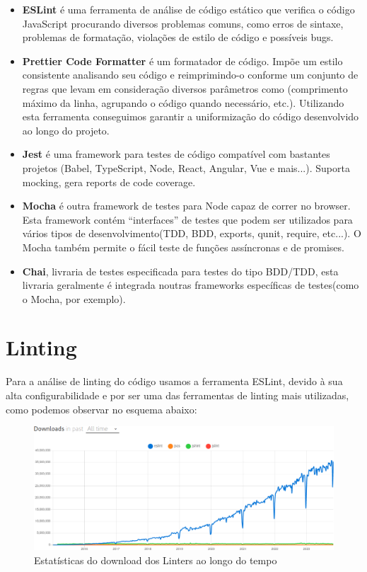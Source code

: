 \documentclass[a4paper,12pt]{article} %
\begin{document}
\begin{itemize}
	\item \textbf{ESLint} é uma ferramenta de análise de código estático que verifica o código JavaScript procurando diversos problemas comuns, como erros de sintaxe, problemas de formatação, violações de estilo de código e possíveis bugs.

	\item \textbf{Prettier Code Formatter} é um formatador de código. Impõe um estilo consistente analisando seu código e reimprimindo-o conforme um conjunto de regras que levam em consideração diversos parâmetros como (comprimento máximo da linha, agrupando o código quando necessário, etc.). Utilizando esta ferramenta conseguimos garantir a uniformização do código desenvolvido ao longo do projeto.

	\item \textbf{Jest} é uma framework para testes de código compatível com bastantes projetos (Babel, TypeScript, Node, React, Angular, Vue e mais...). Suporta mocking, gera reports de code coverage.

	\item \textbf{Mocha} é outra framework de testes para Node capaz de correr no browser. Esta framework contém “interfaces” de testes que podem ser utilizados para vários tipos de desenvolvimento(TDD, BDD, exports, qunit, require, etc...). O Mocha também permite o fácil teste de funções assíncronas e de promises.

	\item \textbf{Chai}, livraria de testes especificada para testes do tipo BDD/TDD, esta livraria geralmente é integrada noutras frameworks específicas de testes(como o Mocha, por exemplo).
\end{itemize}

\newpage
\section{Linting}
Para a análise de linting do código usamos a ferramenta ESLint, devido à sua alta configurabilidade e por ser uma das ferramentas de linting mais utilizadas, como podemos observar no esquema abaixo:

\vspace{1cm}
\begin{figure}[ht!]
	\centering
	\includegraphics[scale=1.5]{images/lintTrend.png}
	\caption[Estatísticas de Download de Linters]{Estatísticas do download dos Linters ao longo do tempo\footnotemark}
\end{figure}
\end{document}
